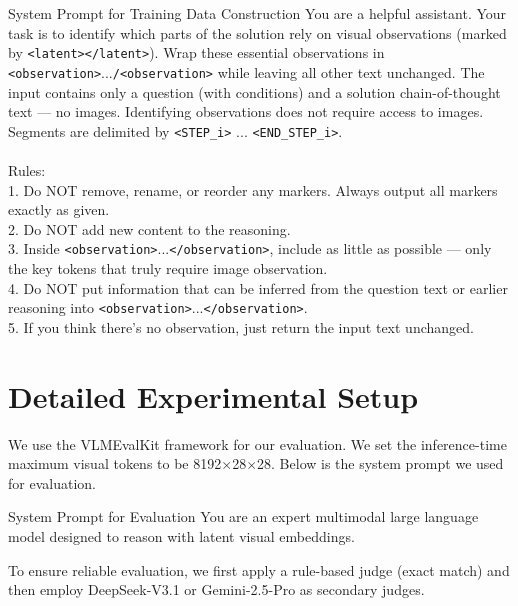 \begin{promptbox}{System Prompt for Training Data Construction}
You are a helpful assistant. Your task is to identify which parts of the solution rely on visual observations (marked by \verb|<latent>|\verb|</latent>|). Wrap these essential observations in \verb|<observation>|...\verb|/<observation>| while leaving all other text unchanged. The input contains only a question (with conditions) and a solution chain-of-thought text — no images. Identifying observations does not require access to images. Segments are delimited by \verb|<STEP_i>| ... \verb|<END_STEP_i>|.\\
\\
Rules:\\
1. Do NOT remove, rename, or reorder any markers. Always output all markers exactly as given.\\
2. Do NOT add new content to the reasoning.\\
3. Inside \verb|<observation>|...\verb|</observation>|, include as little as possible — only the key tokens that truly require image observation.\\
4. Do NOT put information that can be inferred from the question text or earlier reasoning into \verb|<observation>|...\verb|</observation>|.\\
5. If you think there's no observation, just return the input text unchanged.\\
\end{promptbox}


\section{Detailed Experimental Setup }
\label{app:detailed_experimental_setup}
We use the VLMEvalKit \citep{duan2024vlmevalkit} framework for our evaluation.
We set the inference-time maximum visual tokens to be 8192$\times$28$\times$28. 
Below is the system prompt we used for evaluation. 

\begin{promptbox}{System Prompt for Evaluation}
You are an expert multimodal large language model designed to reason with latent visual embeddings.
\end{promptbox}

To ensure reliable evaluation, we first apply a rule-based judge (exact match) and then employ DeepSeek-V3.1 or Gemini-2.5-Pro as secondary judges.







